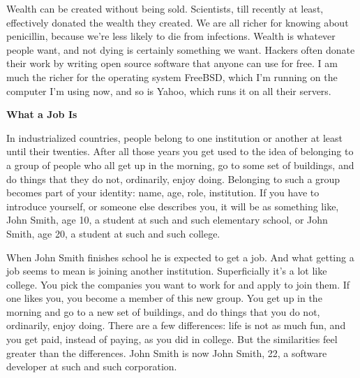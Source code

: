 Wealth can be created
                    without being sold. Scientists, till recently at least,
                    effectively donated the wealth they created. We are all
                    richer for knowing about penicillin, because we're less
                    likely to die from infections. Wealth is whatever people
                    want, and not dying is certainly something we want. Hackers
                    often donate their work by writing open source software that
                    anyone can use for free. I am much the richer for the
                    operating system FreeBSD, which I'm running on the computer
                    I'm using now, and so is Yahoo, which runs it on all their
                    servers.

\textbf{What a Job Is}

In
                    industrialized countries, people belong to one institution
                    or another at least until their twenties. After all those
                    years you get used to the idea of belonging to a group of
                    people who all get up in the morning, go to some set of
                    buildings, and do things that they do not, ordinarily, enjoy
                    doing. Belonging to such a group becomes part of your
                    identity: name, age, role, institution. If you have to
                    introduce yourself, or someone else describes you, it will
                    be as something like, John Smith, age 10, a student at such
                    and such elementary school, or John Smith, age 20, a student
                    at such and such college.

When John Smith
                    finishes school he is expected to get a job. And what
                    getting a job seems to mean is joining another institution.
                    Superficially it's a lot like college. You pick the
                    companies you want to work for and apply to join them. If
                    one likes you, you become a member of this new group. You
                    get up in the morning and go to a new set of buildings, and
                    do things that you do not, ordinarily, enjoy doing. There
                    are a few differences: life is not as much fun, and you get
                    paid, instead of paying, as you did in college. But the
                    similarities feel greater than the differences. John Smith
                    is now John Smith, 22, a software developer at such and such
                    corporation.

